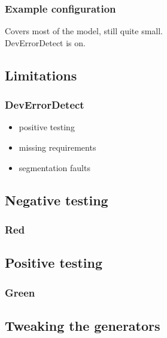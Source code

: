 \documentclass{beamer}
\begin{document}
\begin{frame}
  \frametitle{Example configuration}
  Covers most of the model, still quite small.\\
  DevErrorDetect is on.\\
\end{frame}

\subsection{Limitations}

\begin{frame}
  \frametitle{DevErrorDetect}
  \begin{itemize}
    \item positive testing
    \item missing requirements
    \item segmentation faults
  \end{itemize}
\end{frame}

\subsection{Negative testing}

\begin{frame}
  \frametitle{Red}
\end{frame}

\subsection{Positive testing}

\begin{frame}
  \frametitle{Green}
\end{frame}

\subsection{Tweaking the generators}
\end{document}
